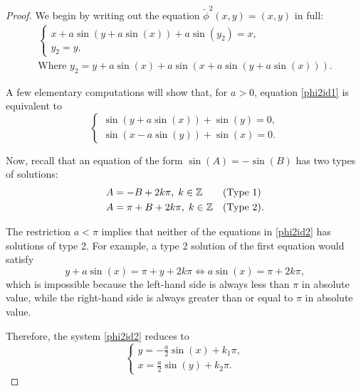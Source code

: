 \begin{proof}
We begin by writing out the equation $\tilde\phi^2(x,y) = (x,y)$ in full:
\begin{equation}\label{phi2id1}
\begin{gathered}
\begin{cases}
x + a \sin(y + a \sin(x)) + a \sin(y_2) = x,\\
y_2 = y,
\end{cases}\\
\text{Where $y_2 = y + a \sin(x) + a \sin(x + a \sin(y + a \sin(x)))$.}
\end{gathered}
\end{equation}

A few elementary computations will show that, for $a > 0$, equation \eqref{phi2id1} is equivalent to
\begin{equation}\label{phi2id2}
\begin{cases}
\sin(y + a \sin(x)) + \sin(y) = 0,\\
\sin(x - a \sin(y)) + \sin(x) = 0.
\end{cases}
\end{equation}

Now, recall that an equation of the form $\sin(A) = - \sin(B)$ has two types of solutions:
\begin{equation}
\begin{aligned}
A &= - B + 2 k \pi, \; k \in \mathbb{Z} && \text{(Type 1)}\\
A &= \pi + B + 2 k \pi, \; k \in \mathbb{Z} && \text{(Type 2).}
\end{aligned}
\end{equation}

The restriction $a < \pi$ implies that neither of the equations in \eqref{phi2id2} has solutions of type 2. For example, a type 2 solution of the first equation would satisfy
\begin{equation}
y + a \sin(x) = \pi + y + 2 k \pi \iff a \sin(x) = \pi + 2 k \pi,
\end{equation}
which is impossible because the left-hand side is always less than $\pi$ in absolute value, while the right-hand side is always greater than or equal to $\pi$ in absolute value.

Therefore, the system \eqref{phi2id2} reduces to
\begin{equation}
\begin{cases}
y = - \frac a 2 \sin(x) + k_1 \pi,\\
x = \frac a 2 \sin(y) + k_2 \pi.
\end{cases}
\end{equation}


\end{proof}
